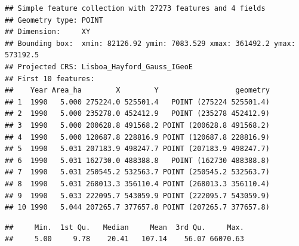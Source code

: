 \documentclass[
]{article}
\newenvironment{Shaded}{\begin{snugshade}}{\end{snugshade}}
\newcommand{\AttributeTok}[1]{\textcolor[rgb]{0.13,0.29,0.53}{#1}}
\newcommand{\CommentTok}[1]{\textcolor[rgb]{0.56,0.35,0.01}{\textit{#1}}}
\newcommand{\DecValTok}[1]{\textcolor[rgb]{0.00,0.00,0.81}{#1}}
\newcommand{\FunctionTok}[1]{\textcolor[rgb]{0.13,0.29,0.53}{\textbf{#1}}}
\newcommand{\NormalTok}[1]{#1}
\newcommand{\SpecialCharTok}[1]{\textcolor[rgb]{0.81,0.36,0.00}{\textbf{#1}}}
\begin{document}
\begin{verbatim}
## Simple feature collection with 27273 features and 4 fields
## Geometry type: POINT
## Dimension:     XY
## Bounding box:  xmin: 82126.92 ymin: 7083.529 xmax: 361492.2 ymax: 573192.5
## Projected CRS: Lisboa_Hayford_Gauss_IGeoE
## First 10 features:
##    Year Area_ha        X        Y                  geometry
## 1  1990   5.000 275224.0 525501.4   POINT (275224 525501.4)
## 2  1990   5.000 235278.0 452412.9   POINT (235278 452412.9)
## 3  1990   5.000 200628.8 491568.2 POINT (200628.8 491568.2)
## 4  1990   5.000 120687.8 228816.9 POINT (120687.8 228816.9)
## 5  1990   5.031 207183.9 498247.7 POINT (207183.9 498247.7)
## 6  1990   5.031 162730.0 488388.8   POINT (162730 488388.8)
## 7  1990   5.031 250545.2 532563.7 POINT (250545.2 532563.7)
## 8  1990   5.031 268013.3 356110.4 POINT (268013.3 356110.4)
## 9  1990   5.033 222095.7 543059.9 POINT (222095.7 543059.9)
## 10 1990   5.044 207265.7 377657.8 POINT (207265.7 377657.8)
\end{verbatim}

\begin{Shaded}
\end{Shaded}

\begin{verbatim}
##     Min.  1st Qu.   Median     Mean  3rd Qu.     Max. 
##     5.00     9.78    20.41   107.14    56.07 66070.63
\end{verbatim}

\begin{Shaded}
\end{Shaded}
\end{document}
